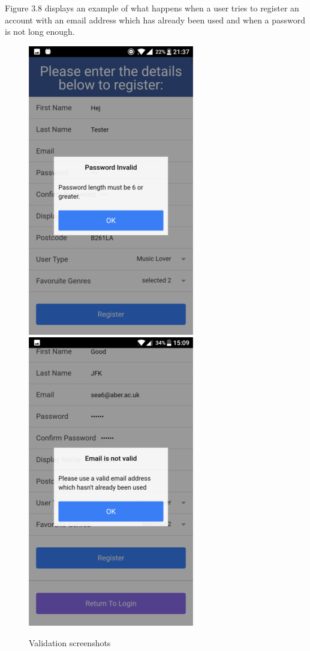 Figure 3.8 displays an example of what happens when a user tries to register an account with an email address which has already been used and when a password is not long enough.
\begin{center}
\begin{figure}[H]
\includegraphics[scale=0.5]{images/sc5}
\includegraphics[scale=0.5]{images/sc6}
\caption{Validation screenshots}
\end{figure}
\end{center}

